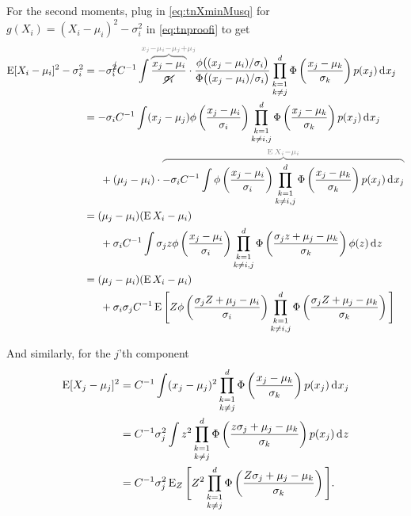 For the second moments, plug in \cref{eq:tnXminMusq} for $g(X_i)= (X_i - \mu_i)^2 - \sigma_i^2$ in \cref{eq:tnproofi} to get
\begin{align*}
  \E [X_i - \mu_i]^2 - \sigma_i^2
  &= - \sigma_i^{\cancel{2}} C^{-1} \int   
  \greyoverbrace{\frac{x_j - \mu_i}{\cancel{\sigma_i}}}{\hidewidth x_j - \mu_i - \mu_j + \mu_j \hidewidth} \cdot
  \frac{\phi\big( (x_j - \mu_i) / \sigma_i \big)}{\Phi\big( (x_j - \mu_i) / \sigma_i \big)}
  \mathop{\prod_{k=1}^d}_{k \neq j} \Phi \left( \frac{x_j - \mu_k}{\sigma_k} \right)  p(x_j) \dint x_j \\
  &= - \sigma_i C^{-1} \int  
  (x_j - \mu_j)
  \phi \left( \frac{x_j-\mu_i}{\sigma_i} \right)
  \mathop{\prod_{k=1}^d}_{k \neq i,j} \Phi \left( \frac{x_j - \mu_k}{\sigma_k} \right)  p(x_j) \dint x_j \\
  &\phantom{==} +  (\mu_j-\mu_i)  \cdot 
  \greyoverbrace{-\sigma_i C^{-1} \int  
  \phi \left( \frac{x_j-\mu_i}{\sigma_i} \right)
  \mathop{\prod_{k=1}^d}_{k \neq i,j} \Phi \left( \frac{x_j - \mu_k}{\sigma_k} \right)  p(x_j) \dint x_j}{\E X_i - \mu_i} \\
  &= (\mu_j-\mu_i)(\E X_i - \mu_i)  \\
  &\phantom{==}
  + \sigma_i C^{-1} \int  \sigma_j z 
  \phi \left( \frac{x_j-\mu_i}{\sigma_i} \right)
  \mathop{\prod_{k=1}^d}_{k \neq i,j} \Phi \left( \frac{\sigma_j z + \mu_j - \mu_k}{\sigma_k} \right)  \phi(z) \dint z \\
  &= (\mu_j-\mu_i)(\E X_i - \mu_i) \\
  &\phantom{==} + \sigma_i\sigma_j C^{-1} 
  \E \Bigg[
  Z \phi \left( \frac{\sigma_j Z + \mu_j -\mu_i}{\sigma_i} \right) 
  \mathop{\prod_{k=1}^d}_{k \neq i,j} \Phi \left( \frac{\sigma_j Z + \mu_j - \mu_k}{\sigma_k} \right) 
  \Bigg]
\end{align*}

And similarly, for the $j$'th component
\begin{align*}
  \operatorname{E} [X_j - \mu_j]^2
  &= C^{-1} \int (x_j - \mu_j)^2  \mathop{\prod_{k=1}^d}_{k \neq j} \Phi \left( \frac{x_j - \mu_k}{\sigma_k} \right) p(x_j) \operatorname{d}\hspace{0.5pt}\! x_j \\
   &= C^{-1} \sigma_j^2 \int z^2  \mathop{\prod_{k=1}^d}_{k \neq j} \Phi \left( \frac{z\sigma_j + \mu_j - \mu_k}{\sigma_k} \right) p(x_j) \operatorname{d}\hspace{0.5pt}\! z \\
   &= C^{-1} \sigma_j^2 
   \operatorname{E}_Z \Bigg[ Z^2  \mathop{\prod_{k=1}^d}_{k \neq j} \Phi \left( \frac{Z\sigma_j + \mu_j - \mu_k}{\sigma_k} \right) \Bigg].
\end{align*}

